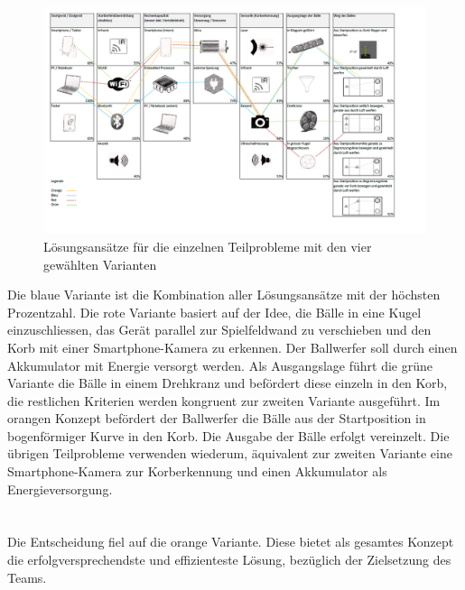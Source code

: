 \\
\newpage
\begin{figure}[h!]
	\centering
	\includegraphics[width=1.08\textwidth]{Enddokumentation/Varianten/Bilder/Grobkonzept.png}
	\caption{Lösungsansätze für die einzelnen Teilprobleme mit den vier gewählten Varianten}
	\label{fig:Grobkonzept}
\end{figure}
Die blaue Variante ist die Kombination aller Lösungsansätze mit der höchsten Prozentzahl. Die rote Variante basiert auf der Idee, die Bälle in eine Kugel einzuschliessen, das Gerät parallel zur Spielfeldwand zu verschieben und den Korb mit einer Smartphone-Kamera zu erkennen. Der Ballwerfer soll durch einen Akkumulator mit Energie versorgt werden. Als Ausgangslage führt die grüne Variante die Bälle in einem Drehkranz und befördert diese einzeln in den Korb, die restlichen Kriterien werden kongruent zur zweiten Variante ausgeführt. Im orangen Konzept befördert der Ballwerfer die Bälle aus der Startposition in bogenförmiger Kurve in den Korb. Die Ausgabe der Bälle erfolgt vereinzelt. Die übrigen Teilprobleme verwenden wiederum, äquivalent zur zweiten Variante eine Smartphone-Kamera zur Korberkennung und einen Akkumulator als Energieversorgung.\\
\\\\
Die Entscheidung fiel auf die orange Variante. Diese bietet als gesamtes Konzept die erfolgversprechendste und effizienteste Lösung, bezüglich der Zielsetzung des Teams. \\

